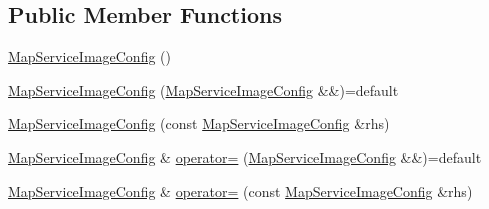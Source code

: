 \subsection*{Public Member Functions}
\begin{DoxyCompactItemize}
\item 
\hyperlink{structdg_1_1deepcore_1_1imagery_1_1_map_service_image_config_a4e88201a5249fdcc93e80e229cd5c24c}{Map\+Service\+Image\+Config} ()
\item 
\hyperlink{structdg_1_1deepcore_1_1imagery_1_1_map_service_image_config_ad4fec948c6c3b9cb4a061193918ac03e}{Map\+Service\+Image\+Config} (\hyperlink{structdg_1_1deepcore_1_1imagery_1_1_map_service_image_config}{Map\+Service\+Image\+Config} \&\&)=default
\item 
\hyperlink{structdg_1_1deepcore_1_1imagery_1_1_map_service_image_config_a678554021d4529350c2432239277c5f8}{Map\+Service\+Image\+Config} (const \hyperlink{structdg_1_1deepcore_1_1imagery_1_1_map_service_image_config}{Map\+Service\+Image\+Config} \&rhs)
\item 
\hyperlink{structdg_1_1deepcore_1_1imagery_1_1_map_service_image_config}{Map\+Service\+Image\+Config} \& \hyperlink{structdg_1_1deepcore_1_1imagery_1_1_map_service_image_config_aaf5d3a45c3400e74e047525022ca6995}{operator=} (\hyperlink{structdg_1_1deepcore_1_1imagery_1_1_map_service_image_config}{Map\+Service\+Image\+Config} \&\&)=default
\item 
\hyperlink{structdg_1_1deepcore_1_1imagery_1_1_map_service_image_config}{Map\+Service\+Image\+Config} \& \hyperlink{structdg_1_1deepcore_1_1imagery_1_1_map_service_image_config_ad8cef3a89fe773986aa83f3315f428c3}{operator=} (const \hyperlink{structdg_1_1deepcore_1_1imagery_1_1_map_service_image_config}{Map\+Service\+Image\+Config} \&rhs)
\end{DoxyCompactItemize}

